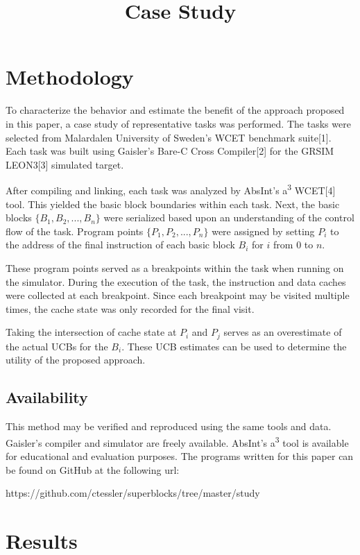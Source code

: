 \documentclass[12pt]{article}
\title{Case Study}
\begin{document}
\section{Methodology}

To characterize the behavior and estimate the benefit of the approach
proposed in this paper, a case study of representative tasks was
performed. The tasks were selected from Malardalen University of
Sweden's WCET benchmark suite[1]. Each task was built using Gaisler's
Bare-C Cross Compiler[2] for the GRSIM LEON3[3] simulated target. 

After compiling and linking, each task was analyzed by AbsInt's
a\textsuperscript{3} WCET[4] tool. This yielded the basic block
boundaries within each task. Next, the basic blocks
${\{B_1, B_2, ..., B_n\}}$ were serialized based upon an understanding of
the control flow of the task. Program points
${\{P_1, P_2, ..., P_n\}}$ were assigned by setting ${P_i}$ to the
address of the final instruction of each basic block ${B_i}$ for ${i}$
from ${0}$ to ${n}$.

These program points served as a breakpoints within the task when
running on the simulator. During the execution of the task, the
instruction and data caches were collected at each breakpoint. Since
each breakpoint may be visited multiple times, the cache state was
only recorded for the final visit.

Taking the intersection of cache state at ${P_i}$ and ${P_j}$
serves as an overestimate of the actual UCBs for the ${B_i}$. These
UCB estimates can be used to determine the utility of the proposed
approach. 

\subsection{Availability}

This method may be verified and reproduced using the same tools and
data. Gaisler's compiler and simulator are freely available. AbsInt's
a\textsuperscript{3} tool is available for educational and evaluation
purposes. The programs written for this paper can be found on GitHub
at the following url:

\begin{center}
https://github.com/ctessler/superblocks/tree/master/study
\end{center}


\section{Results}
\end{document}
